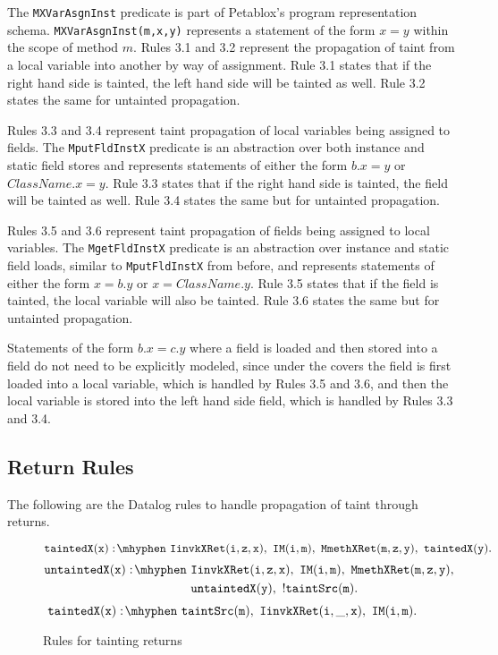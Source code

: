 The \texttt{MXVarAsgnInst} predicate is part of Petablox's program
representation schema. \texttt{MXVarAsgnInst(m,x,y)} represents a
statement of the form $x = y$ within the scope of method $m$. Rules
3.1 and 3.2 represent the propagation of taint from a local variable
into another by way of assignment. Rule 3.1 states that if the right
hand side is tainted, the left hand side will be tainted as well. Rule
3.2 states the same for untainted propagation.

Rules 3.3 and 3.4 represent taint propagation of local variables being
assigned to fields. The \texttt{MputFldInstX} predicate is an
abstraction over both instance and static field stores and represents
statements of either the form $b.x = y$ or $ClassName.x = y$. Rule 3.3
states that if the right hand side is tainted, the field will be
tainted as well. Rule 3.4 states the same but for untainted
propagation.

Rules 3.5 and 3.6 represent taint propagation of fields being assigned
to local variables. The \texttt{MgetFldInstX} predicate is an
abstraction over instance and static field loads, similar to
\texttt{MputFldInstX} from before, and represents statements of either
the form $x = b.y$ or $x = ClassName.y$. Rule 3.5 states that if the
field is tainted, the local variable will also be tainted. Rule 3.6
states the same but for untainted propagation.

Statements of the form $b.x = c.y$ where a field is loaded and then
stored into a field do not need to be explicitly modeled, since under
the covers the field is first loaded into a local variable, which is
handled by Rules 3.5 and 3.6, and then the local variable is stored
into the left hand side field, which is handled by Rules 3.3 and 3.4.
\subsection{Return Rules}
The following are the Datalog rules to handle propagation of taint
through returns.
\begin{figure}[H]
\begin{equation}
  \mathtt{taintedX(x) \is IinvkXRet(i,z,x) \also IM(i,m) \also
    MmethXRet(m,z,y) \also taintedX(y).}
\end{equation}
\begin{equation}
  \begin{split}
    \mathtt{untaintedX(x) \is} & \mathtt{IinvkXRet(i,z,x) \also
      IM(i,m) \also MmethXRet(m,z,y) \also} \\ & \mathtt{
      untaintedX(y) \also !taintSrc(m).} \\
  \end{split}
\end{equation}
\begin{equation}
  \mathtt{taintedX(x) \is taintSrc(m) \also IinvkXRet(i,\_,x) \also
    IM(i,m).}
\end{equation}
\caption{Rules for tainting returns}\label{fig:ret}
\end{figure}

